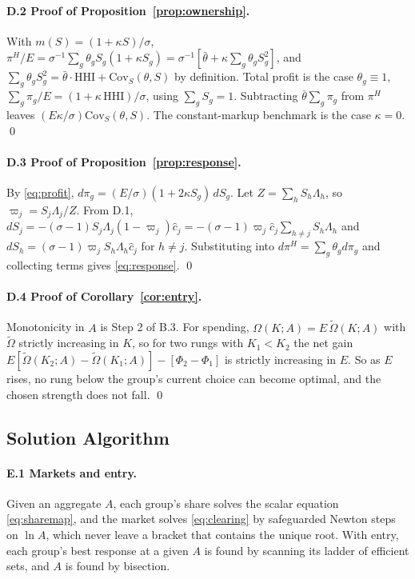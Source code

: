 \documentclass[11pt]{article}
\theoremstyle{definition}
\theoremstyle{remark}
\begin{document}
\paragraph{D.2 Proof of Proposition~\ref{prop:ownership}.} With $m(S)=(1+\kappa
S)/\sigma$, $\pi^H/E=\sigma^{-1}\sum_g\theta_gS_g(1+\kappa S_g)
=\sigma^{-1}[\bar\theta+\kappa\sum_g\theta_gS_g^2]$, and
$\sum_g\theta_gS_g^2=\bar\theta\cdot\mathrm{HHI}+\mathrm{Cov}_S(\theta,S)$ by
definition. Total profit is the case $\theta_g\equiv1$,
$\sum_g\pi_g/E=(1+\kappa\,\mathrm{HHI})/\sigma$, using $\sum_gS_g=1$. Subtracting
$\bar\theta\sum_g\pi_g$ from $\pi^H$ leaves $(E\kappa/\sigma)\mathrm{Cov}_S(\theta,S)$.
The constant-markup benchmark is the case $\kappa=0$. \qed

\paragraph{D.3 Proof of Proposition~\ref{prop:response}.} By \eqref{eq:profit},
$d\pi_g=(E/\sigma)(1+2\kappa S_g)\,dS_g$. Let $Z=\sum_hS_h\Lambda_h$, so
$\varpi_j=S_j\Lambda_j/Z$. From D.1,
$dS_j=-(\sigma-1)S_j\Lambda_j(1-\varpi_j)\hat c_j=-(\sigma-1)\varpi_j\hat c_j\sum_{h\neq
j}S_h\Lambda_h$ and $dS_h=(\sigma-1)\varpi_jS_h\Lambda_h\hat c_j$ for $h\neq j$.
Substituting into $d\pi^H=\sum_g\theta_gd\pi_g$ and collecting terms gives
\eqref{eq:response}. \qed

\paragraph{D.4 Proof of Corollary~\ref{cor:entry}.} Monotonicity in $A$ is Step 2 of
B.3. For spending, $\Omega(K;A)=E\,\tilde\Omega(K;A)$ with $\tilde\Omega$ strictly
increasing in $K$, so for two rungs with $K_1<K_2$ the net gain
$E[\tilde\Omega(K_2;A)-\tilde\Omega(K_1;A)]-[\Phi_2-\Phi_1]$ is strictly increasing in
$E$. So as $E$ rises, no rung below the group's current choice can become optimal,
and the chosen strength does not fall. \qed

\subsection{Solution Algorithm}
\label{app:algo}

\paragraph{E.1 Markets and entry.} Given an aggregate $A$, each group's share solves
the scalar equation \eqref{eq:sharemap}, and the market solves \eqref{eq:clearing} by
safeguarded Newton steps on $\ln A$, which never leave a bracket that contains the
unique root. With entry, each group's best response at a given $A$ is found by scanning
its ladder of efficient sets, and $A$ is found by bisection.
\end{document}
